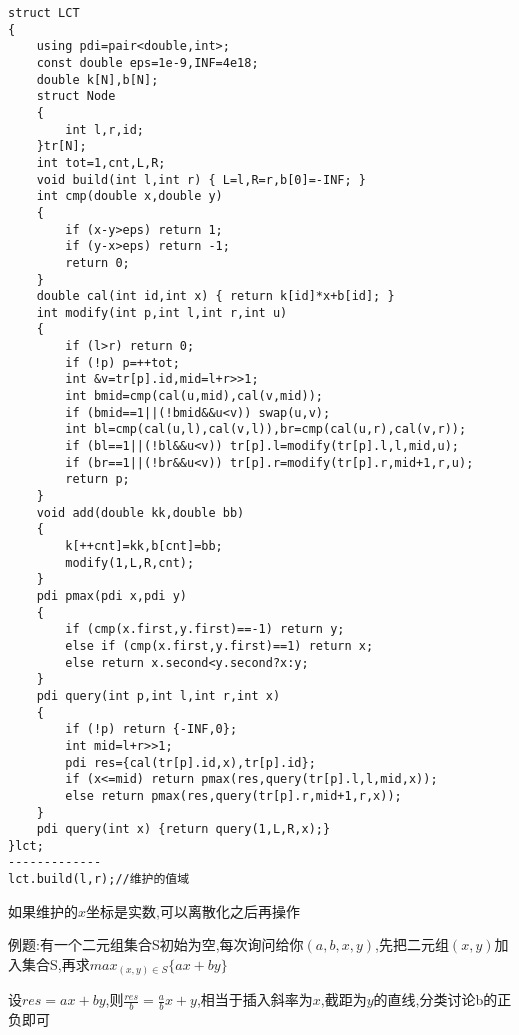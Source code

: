 \documentclass[a4paper]{ctexart}
\begin{document}
\begin{lstlisting}
struct LCT
{
    using pdi=pair<double,int>;
    const double eps=1e-9,INF=4e18;
    double k[N],b[N];
    struct Node
    {
        int l,r,id;
    }tr[N];
    int tot=1,cnt,L,R;
    void build(int l,int r) { L=l,R=r,b[0]=-INF; }
    int cmp(double x,double y)
    {
        if (x-y>eps) return 1;
        if (y-x>eps) return -1;
        return 0;
    }
    double cal(int id,int x) { return k[id]*x+b[id]; }
    int modify(int p,int l,int r,int u)
    {
        if (l>r) return 0;
        if (!p) p=++tot;
        int &v=tr[p].id,mid=l+r>>1;
        int bmid=cmp(cal(u,mid),cal(v,mid));
        if (bmid==1||(!bmid&&u<v)) swap(u,v);
        int bl=cmp(cal(u,l),cal(v,l)),br=cmp(cal(u,r),cal(v,r));
        if (bl==1||(!bl&&u<v)) tr[p].l=modify(tr[p].l,l,mid,u);
        if (br==1||(!br&&u<v)) tr[p].r=modify(tr[p].r,mid+1,r,u);
        return p;
    }
    void add(double kk,double bb)
    {
        k[++cnt]=kk,b[cnt]=bb;
        modify(1,L,R,cnt);
    }
    pdi pmax(pdi x,pdi y)
    {
        if (cmp(x.first,y.first)==-1) return y;
        else if (cmp(x.first,y.first)==1) return x;
        else return x.second<y.second?x:y;
    }
    pdi query(int p,int l,int r,int x)
    {
        if (!p) return {-INF,0};
        int mid=l+r>>1;
        pdi res={cal(tr[p].id,x),tr[p].id};
        if (x<=mid) return pmax(res,query(tr[p].l,l,mid,x));
        else return pmax(res,query(tr[p].r,mid+1,r,x));
    }
    pdi query(int x) {return query(1,L,R,x);}
}lct;
-------------
lct.build(l,r);//维护的值域
\end{lstlisting}

如果维护的$x$坐标是实数,可以离散化之后再操作

例题:有一个二元组集合S初始为空,每次询问给你$(a,b,x,y)$,先把二元组$(x,y)$加入集合S,再求$max_{(x,y)\in S}\{ax+by\}$

设$res=ax+by$,则$\frac{res}{b}=\frac{a}{b}x+y$,相当于插入斜率为$x$,截距为$y$的直线,分类讨论b的正负即可
\end{document}
